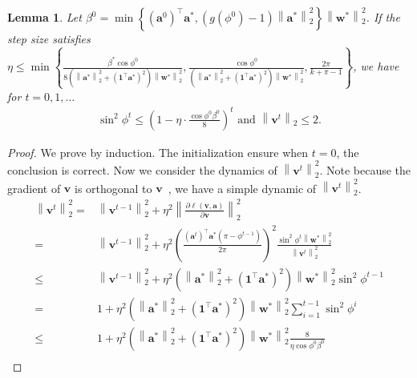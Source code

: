 \documentclass{article}
\newcommand{\firstlayer}{w}
\newcommand{\firstlayerWN}{v}
\newcommand{\secondlayer}{a}
\newcommand{\vect}[1]{\mathbf{#1}}
\newcommand{\norm}[1]{\left\|#1\right\|}
\newtheorem{lem}{Lemma}[section]
\begin{document}
\begin{lem}
\label{lem:firstlayerWN_norm_always_small}
	Let $\beta^0 = \min\left\{\left(\vect{\secondlayer}^0\right)^\top \vect{\secondlayer}^*,\left(g(\phi^0)-1\right)\norm{\vect{\secondlayer}^*}_2^2\right\}\norm{\vect{\firstlayer}^*}_2^2$.
	If the step size satisfies $\eta \le \min\left\{\frac{\beta^*\cos\phi^0}{8\left(\norm{\vect{\secondlayer}^*}_2^2+\left(\vect{1}^\top \vect{\secondlayer}^*\right)^2\right)\norm{\vect{\firstlayer}^*}_2^2}, \frac{\cos\phi^0}{\left(\norm{\vect{\secondlayer}^*}_2^2+\left(\vect{1}^\top \vect{\secondlayer}^*\right)^2\right)\norm{\vect{\firstlayer}^*}_2^2}, \frac{2\pi}{k+\pi-1}\right\}$, we have for $t=0,1,\ldots$\begin{align*}
	\sin^2\phi^{t} \le \left(1-\eta\cdot\frac{\cos\phi^0\beta^0}{8}\right)^t \text{ and }\norm{\vect{\firstlayerWN}^t}_2 \le 2.
	\end{align*} 
\end{lem}\begin{proof}
We prove by induction.
The initialization ensure when $t=0$, the conclusion is correct.
Now we consider the dynamics of $\norm{\vect{\firstlayerWN}^t}_2^2$. 
Note because the gradient of $\vect{\firstlayerWN}$ is orthogonal to $\vect{\firstlayerWN}$~\citep{salimans2016weight}, we have a simple dynamic of $\norm{\vect{\firstlayerWN}^t}_2^2$.
\begin{align*}
\norm{\vect{\firstlayerWN}^{t}}_2^2 = &\norm{\vect{\firstlayerWN}^{t-1}}_2^2 + \eta^2\norm{\frac{\partial \ell\left(\vect{\firstlayerWN},\vect{\secondlayer}\right)}{\partial \vect{\firstlayerWN}}}_2^2 \\
= & \norm{\vect{\firstlayerWN}^{t-1}}_2^2 + \eta^2\left(\frac{\left(\vect{\secondlayer}^t\right)^\top\vect{\secondlayer}^*\left(\pi-\phi^{t-1}\right)}{2\pi}\right)^2\frac{\sin^2\phi^t\norm{\vect{\firstlayer}^*}_2^2}{\norm{\vect{\firstlayerWN}^t}_2^2}\\
\le & \norm{\vect{\firstlayerWN}^{t-1}}_2^2 + \eta^2\left(\norm{\vect{\secondlayer}^*}_2^2+\left(\vect{1}^\top \vect{\secondlayer}^*\right)^2\right)\norm{\vect{\firstlayer}^*}_2^2\sin^2\phi^{t-1}\\
= & 1 + \eta^2\left(\norm{\vect{\secondlayer}^*}_2^2+\left(\vect{1}^\top \vect{\secondlayer}^*\right)^2\right)\norm{\vect{\firstlayer}^*}_2^2\sum_{i=1}^{t-1}\sin^2\phi^i\\
\le & 1 +\eta^2\left(\norm{\vect{\secondlayer}^*}_2^2+\left(\vect{1}^\top \vect{\secondlayer}^*\right)^2\right)\norm{\vect{\firstlayer}^*}_2^2\frac{8}{\eta\cos\phi^0\beta^0}\\

\end{align*}
\end{proof}
\end{document}

